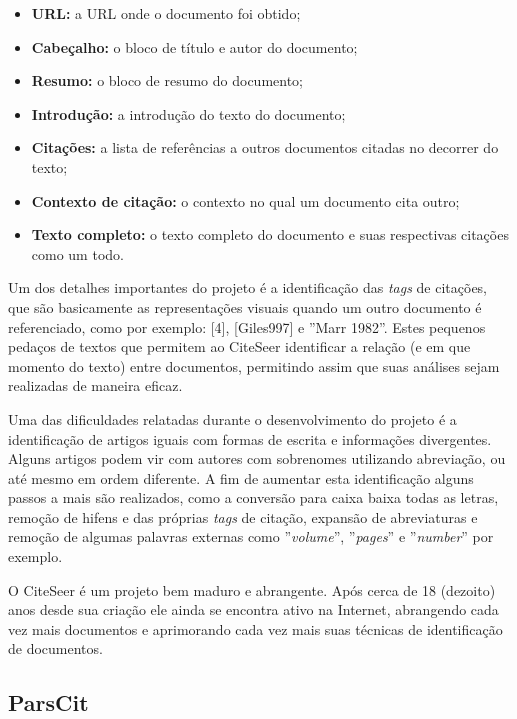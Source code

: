 \begin{itemize}
    \item \textbf{URL:} a URL onde o documento foi obtido;
    \item \textbf{Cabeçalho:} o bloco de título e autor do documento;
    \item \textbf{Resumo:} o bloco de resumo do documento;
    \item \textbf{Introdução:} a introdução do texto do documento;
    \item \textbf{Citações:} a lista de referências a outros documentos citadas no decorrer do texto;
    \item \textbf{Contexto de citação:} o contexto no qual um documento cita outro;
    \item \textbf{Texto completo:} o texto completo do documento e suas respectivas citações como um todo.
\end{itemize}

Um dos detalhes importantes do projeto é a identificação das \textit{tags} de citações, que são basicamente as representações visuais quando um outro documento é referenciado, como por exemplo: [4], [Giles997] e ''Marr 1982''. Estes pequenos pedaços de textos que permitem ao CiteSeer identificar a relação (e em que momento do texto) entre documentos, permitindo assim que suas análises sejam realizadas de maneira eficaz.

Uma das dificuldades relatadas durante o desenvolvimento do projeto é a identificação de artigos iguais com formas de escrita e informações divergentes. Alguns artigos podem vir com autores com sobrenomes utilizando abreviação, ou até mesmo em ordem diferente. A fim de aumentar esta identificação alguns passos a mais são realizados, como a conversão para caixa baixa todas as letras, remoção de hifens e das próprias \textit{tags} de citação, expansão de abreviaturas e remoção de algumas palavras externas como ''\textit{volume}'', ''\textit{pages}'' e ''\textit{number}'' por exemplo.

O CiteSeer é um projeto bem maduro e abrangente. Após cerca de 18 (dezoito) anos desde sua criação ele ainda se encontra ativo na Internet, abrangendo cada vez mais documentos e aprimorando cada vez mais suas técnicas de identificação de documentos.

\subsection{ParsCit}
\label{ssec:parscit}

